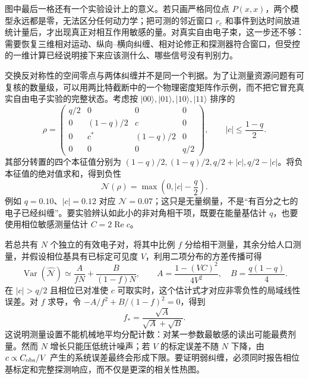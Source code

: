 图中最后一格还有一个实验设计上的意义。若只画严格同位点 $P(x,x)$，两个模型永远都是零，无法区分任何动力学；把可测的邻近窗口 $r_c$ 和事件到达时间放进统计量后，才出现真正对相互作用敏感的量。对真实自由电子束，这一步还不够：需要恢复三维相对运动、纵向--横向纠缠、相对论修正和探测器符合窗口，但受控的一维计算已经说明接下来应该测什么、哪些信号没有判别力。


交换反对称性的空间零点与两体纠缠并不是同一个判据。为了让测量资源问题有可复核的数量级，可以用两比特截断中的一个物理密度矩阵作示例，而不把它冒充真实自由电子实验的完整状态。考虑按 $|00\rangle,|01\rangle,|10\rangle,|11\rangle$ 排序的
\begin{equation}
\rho=\begin{pmatrix}
q/2&0&0&0\\
0&(1-q)/2&c&0\\
0&c^*&(1-q)/2&0\\
0&0&0&q/2
\end{pmatrix},\qquad |c|\le\frac{1-q}{2}.
\label{eq:twoelectron-example-density}
\end{equation}
其部分转置的四个本征值分别为 $(1-q)/2,(1-q)/2,q/2+|c|,q/2-|c|$。将负本征值的绝对值求和，得到负性
\begin{equation}
\mathcal N(\rho)=\max\!\left(0,|c|-\frac q2\right).
\label{eq:twoelectron-example-negativity}
\end{equation}
例如 $q=0.10$、$|c|=0.12$ 对应 $\mathcal N=0.07$；这只是无量纲量，不是“有百分之七的电子已经纠缠”。要实验辨认如此小的非对角相干项，既要在能量基估计 $q$，也要使用相位敏感测量估计 $C=2\operatorname{Re}c$。

若总共有 $N$ 个独立的有效电子对，将其中比例 $f$ 分给相干测量，其余分给人口测量，并假设相位基具有已标定可见度 $V$，利用二项分布的方差传播可得
\begin{equation}
\operatorname{Var}(\widehat{\mathcal N})\simeq\frac{A}{fN}+\frac{B}{(1-f)N},\qquad
A=\frac{1-(VC)^2}{4V^2},\quad B=\frac{q(1-q)}4.
\label{eq:twoelectron-dose-variance}
\end{equation}
在 $|c|>q/2$ 且相位已对准使 $c$ 可取实时，这个估计式才对应非零负性的局域线性误差。对 $f$ 求导，令 $-A/f^2+B/(1-f)^2=0$，得到
\begin{equation}
f_*=\frac{\sqrt A}{\sqrt A+\sqrt B}.
\label{eq:twoelectron-dose-optimum}
\end{equation}
这说明测量设置不能机械地平均分配计数：对某一参数最敏感的读出可能最费剂量。然而 $N$ 增长只能压低统计噪声；若 $V$ 的标定误差不随 $N$ 下降，由 $c\propto C_{\rm obs}/V$ 产生的系统误差最终会形成下限。要证明弱纠缠，必须同时报告相位基标定和完整探测响应，而不仅是更深的相关性热图。

